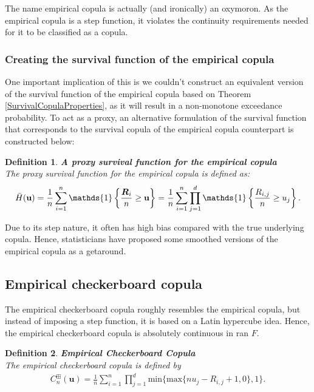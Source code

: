 \documentclass[12pt]{report}
\newtheorem{definition}{Definition}[subsection]
\newcommand{\1}{\mathbf{1}}
\begin{document}
\begin{flushleft}
The name empirical copula is actually (and ironically) an oxymoron. As the empirical copula is a step function, it violates the continuity requirements needed for it to be classified as a copula.\\

\newpage
\subsubsection{Creating the survival function of the empirical copula}
\vspace{0,5cm}
One important implication of this is we couldn't construct an equivalent version of the survival function of the empirical copula based on Theorem \ref{SurvivalCopulaProperties}, as it will result in a non-monotone exceedance probability. To act as a proxy, an alternative formulation of the survival function that corresponds to the survival copula of the empirical copula counterpart is constructed below:

\begin{definition}\label{SurvECDef}
\textbf{A proxy survival function for the empirical copula} \\
The proxy survival function for the empirical copula is defined as:
\begin{align*}
\Bar{H}(\textbf{u}) = \frac{1}{n} \sum\limits_{i = 1}^{n} \mathds{1}\left\{ \frac{\boldsymbol{R}_{i}}{n} \ge \textbf{u} \right\} = \frac{1}{n} \sum\limits_{i = 1}^{n} \prod\limits_{j = 1}^{d} \mathds{1}\left\{ \frac{R_{i,j}}{n} \ge u_{j} \right\}.
\end{align*}
\end{definition}
Due to its step nature, it often has high bias compared with the true underlying copula. Hence, statisticians have proposed some smoothed versions of the empirical copula as a getaround.

\vspace{0.5cm}
\subsection{Empirical checkerboard copula}
\vspace{0.5cm}

The empirical checkerboard copula roughly resembles the empirical copula, but instead of imposing a step function, it is based on a Latin hypercube idea. Hence, the empirical checkerboard copula is absolutely continuous in ran $F$.

\begin{definition}\label{ECCDef}
\textbf{Empirical Checkerboard Copula} \\
The empirical checkerboard copula is defined by
\begin{align*}
C_{n}^{\boxplus}(\textbf{u}) = \frac{1}{n} \sum\limits_{i = 1}^{n} \prod\limits_{j = 1}^{d} \mathrm{min} \{ \mathrm{max} \{ n u_{j} - R_{i,j} + 1, 0 \}, 1 \}.
\end{align*}
\end{definition}


\end{flushleft}
\end{document}
